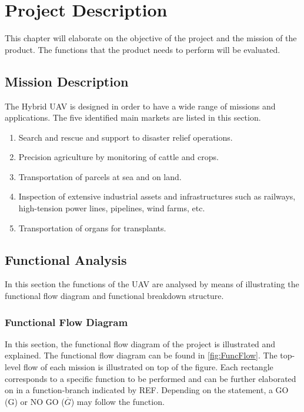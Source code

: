 \chapter{Project Description}
\setlength{\parindent}{15pt}
\label{ch:proj_desc}

This chapter will elaborate on the objective of the project and the mission of the product. The functions that the product needs to perform will be evaluated.  

\section{Mission Description}
\label{sec:miss_desc}
The Hybrid UAV is designed in order to have a wide range of missions and applications. The five identified main markets are listed in this section.

\begin{enumerate}
\item	Search and rescue and support to disaster relief operations.
\item	Precision agriculture by monitoring of cattle and crops.
\item  Transportation of parcels at sea and on land.
\item Inspection of extensive industrial assets and infrastructures such as railways, high-tension power lines, pipelines, wind farms, etc.
\item Transportation of organs for transplants.
\end{enumerate}


\section{Functional Analysis}
\label{ch:func_anal}
\setlength{\parindent}{15pt}

In this section the functions of the UAV are analysed by means of illustrating the functional flow diagram and functional breakdown structure. 

\subsection{Functional Flow Diagram}

In this section, the functional flow diagram of the project is illustrated and explained. The functional flow diagram can be found in \autoref{fig:FuncFlow}. The top-level flow of each mission is illustrated on top of the figure. Each rectangle corresponds to a specific function to be performed and can be further elaborated on in a function-branch indicated by REF. Depending on the statement, a GO (G) or NO GO ($\overline{G}$) may follow the function. 

